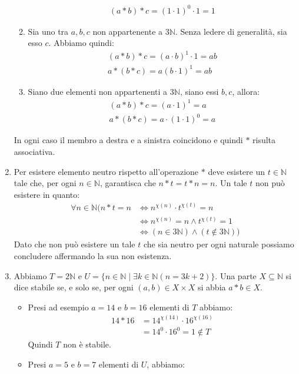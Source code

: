 \begin{enumerate}[label=(\textit{\roman*})]
\begin{enumerate}
\begin{align*}
			(a \ast b) \ast c =  (1 \cdot 1)^{0} \cdot 1 = 1
		\end{align*}
		\item Sia uno tra $a,b,c$ non appartenente a $3\mathbb{N}$. Senza ledere di generalità, sia esso $c$. Abbiamo quindi:
		\begin{align*}
			(a \ast b) \ast c = (a \cdot b) ^{1} \cdot 1 = ab \\
			a \ast (b \ast c) = a(b \cdot 1)^{1} = ab
		\end{align*}
		\item Siano due elementi non appartenenti a $3\mathbb{N}$, siano essi $b,c$, allora:
		\begin{align*}
			(a \ast b) \ast c = (a \cdot 1)^{1} = a \\
			a \ast (b \ast c) = a \cdot (1 \cdot 1)^{0} = a
		\end{align*}
	\end{enumerate}
	In ogni caso il membro a destra e a sinistra coincidono e quindi $\ast$ risulta associativa.
	\item Per esistere elemento neutro rispetto all'operazione $\ast$ deve esistere un $t \in \mathbb{N}$ tale che, per ogni $n \in \mathbb{N}$, garantisca che $n \ast t = t \ast n = n$. Un tale $t$ non può esistere in quanto:
	\begin{align*}
		\forall n \in \mathbb{N} \bigl(n \ast t = n &\iff n^{\chi(n)} \cdot t^{\chi(t)} = n \\
		&\iff n^{\chi(n)} = n \land t^{\chi(t)}=1 \\
		&\iff (n \in 3\mathbb{N}) \land (t \notin 3\mathbb{N}) \bigr)
	\end{align*}
	Dato che non può esistere un tale $t$ che sia neutro per ogni naturale possiamo concludere affermando la sua non esistenza.
	\item Abbiamo $T=2\mathbb{N}$ e $U=\{n \in \mathbb{N} \; | \; \exists k \in \mathbb{N}(n=3k+2)\}$. Una parte $X \subseteq \mathbb{N}$ si dice stabile se, e solo se, per ogni $(a,b) \in X \times X$ si abbia $a \ast b \in X$.
	\begin{itemize}
		\item Presi ad esempio $a=14$ e $b=16$ elementi di $T$ abbiamo:
		\begin{align*}
			14 \ast 16 &= 14^{\chi(14)} \cdot 16^{\chi(16)} \\
			&= 14^{0} \cdot 16^{0} = 1 \notin T
		\end{align*}
		Quindi $T$ non è stabile.
		\item Presi $a=5$ e $b=7$ elementi di $U$, abbiamo:

\end{itemize}
\end{enumerate}
